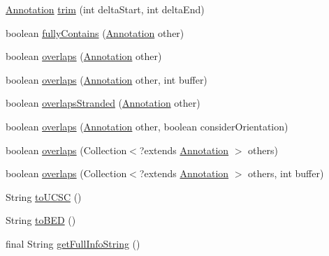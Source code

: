 \begin{DoxyCompactItemize}
\item 
\hyperlink{interfaceumms_1_1core_1_1annotation_1_1_annotation}{Annotation} \hyperlink{classumms_1_1core_1_1annotation_1_1_abstract_annotation_a7101ed1a3444755c06346f6bdb4bdbd0}{trim} (int delta\+Start, int delta\+End)
\item 
boolean \hyperlink{classumms_1_1core_1_1annotation_1_1_abstract_annotation_ab50e2e0eed534b4f5687c7f14ea4a53b}{fully\+Contains} (\hyperlink{interfaceumms_1_1core_1_1annotation_1_1_annotation}{Annotation} other)
\item 
boolean \hyperlink{classumms_1_1core_1_1annotation_1_1_abstract_annotation_aad9f64a8f961a115d390670502a692de}{overlaps} (\hyperlink{interfaceumms_1_1core_1_1annotation_1_1_annotation}{Annotation} other)
\item 
boolean \hyperlink{classumms_1_1core_1_1annotation_1_1_abstract_annotation_a3717e1eafa22cc503d7b2314687c1858}{overlaps} (\hyperlink{interfaceumms_1_1core_1_1annotation_1_1_annotation}{Annotation} other, int buffer)
\item 
boolean \hyperlink{classumms_1_1core_1_1annotation_1_1_abstract_annotation_a6079d65ee2beb510f73bbae6c9ffd8d9}{overlaps\+Stranded} (\hyperlink{interfaceumms_1_1core_1_1annotation_1_1_annotation}{Annotation} other)
\item 
boolean \hyperlink{classumms_1_1core_1_1annotation_1_1_abstract_annotation_a76613aa9a763fce8a264a6fec08b995c}{overlaps} (\hyperlink{interfaceumms_1_1core_1_1annotation_1_1_annotation}{Annotation} other, boolean consider\+Orientation)
\item 
boolean \hyperlink{classumms_1_1core_1_1annotation_1_1_abstract_annotation_a8b134adaed0310b81d3c4c14b97e53f3}{overlaps} (Collection$<$?extends \hyperlink{interfaceumms_1_1core_1_1annotation_1_1_annotation}{Annotation} $>$ others)
\item 
boolean \hyperlink{classumms_1_1core_1_1annotation_1_1_abstract_annotation_a83a10370900d5466d41781ef72a453a0}{overlaps} (Collection$<$?extends \hyperlink{interfaceumms_1_1core_1_1annotation_1_1_annotation}{Annotation} $>$ others, int buffer)
\item 
String \hyperlink{classumms_1_1core_1_1annotation_1_1_abstract_annotation_a67579d07278b8bbffb10f66622fb3557}{to\+U\+C\+S\+C} ()
\item 
String \hyperlink{classumms_1_1core_1_1annotation_1_1_abstract_annotation_a279166461bf64f88b25d6b4b4b9da597}{to\+B\+E\+D} ()
\item 
final String \hyperlink{classumms_1_1core_1_1annotation_1_1_abstract_annotation_a745f96c6e9f859a8f9be365f5916c11d}{get\+Full\+Info\+String} ()

\end{DoxyCompactItemize}
